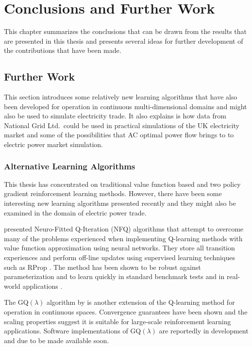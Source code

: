 \chapter{Conclusions and Further Work}
\label{ch:conclusion}
This chapter summarizes the conclusions that can be drawn from the
results that are presented in this thesis and presents several ideas for
further development of the contributions that have been made.

\section{Further Work}
\label{sec:furtherwork}
This section introduces some relatively new learning algorithms that have
also been developed for operation in continuous multi-dimensional domains and
might also be used to simulate electricity trade.
It also explains is how data from National Grid Ltd.~could be used in practical
simulations of the UK electricity market and some of the possibilities that AC
optimal power flow brings to to electric power market simulation.

\subsection{Alternative Learning Algorithms}
This thesis has concentrated on traditional value function based and two policy
gradient reinforcement learning methods.  However, there have been some
interesting new learning algorithms presented recently and they might also be
examined in the domain of electric power trade.

 presented Neuro-Fitted Q-Iteration (NFQ) algorithms
that attempt to overcome many of the problems experienced when implementing
Q-learning methods with value function approximation using neural networks.
They store all transition experiences and perform off-line updates using
supervised learning techniques such as RProp \cite{riedmiller93}.  The method
has been shown to be robust against parameterization and to learn quickly in
standard benchmark tests and in real-world applications \cite{kietzmann09}.

The GQ$(\lambda)$ algorithm by  is another extension of the
Q-learning method for operation in continuous spaces.  Convergence guarantees
have been shown and the scaling properties suggest it is suitable for
large-scale reinforcement learning applications.  Software implementations of
GQ$(\lambda)$ are reportedly in development and due to be made available soon.

